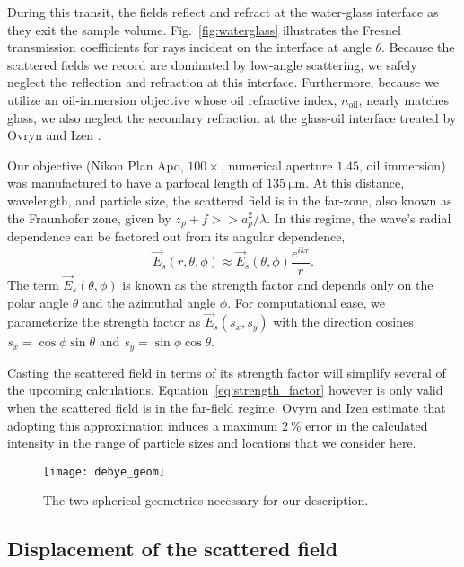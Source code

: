 During this transit, the fields reflect and refract at the water-glass interface as they
exit the sample volume. Fig.~\ref{fig:waterglass} illustrates the Fresnel transmission
coefficients for rays incident on the interface at angle $\theta$.
Because the scattered fields we record are dominated by low-angle scattering,
we safely neglect the reflection and refraction at this interface. Furthermore,
because we utilize an
oil-immersion objective whose oil refractive index, $n_{\text{oil}}$,
nearly matches glass, we also neglect the secondary refraction at the
glass-oil interface treated by Ovryn and Izen \cite{izen00}.

Our objective  (Nikon Plan Apo, $\num{100}\times$, numerical aperture $\num{1.45}$,
oil immersion) was manufactured to have a parfocal length of $\SI{135}{\um}$.
At this distance, wavelength, and particle size, the scattered field is in the far-zone,
also known as the Fraunhofer zone, given by $z_p + f >> a_p^2/\lambda$. In this
regime, the wave's radial dependence can be factored out from its angular dependence,
\begin{equation}
  \label{eq:strength_factor}
  \vec{E}_s(r, \theta, \phi) \approx  \vec{E}_s(\theta, \phi) \frac{e^{ikr}}{r}.
\end{equation}
The term $\vec{E}_s(\theta, \phi)$ is known as the strength factor and
depends only on the polar angle $\theta$ and the azimuthal angle $\phi$. 
For computational ease, we parameterize the strength factor as $\vec{E}_s(s_x, s_y)$
with the direction cosines $s_x=\cos{\phi}\sin{\theta}$ and $s_y = \sin{\phi}\cos{\theta}$.

Casting the scattered field in terms of its strength factor will simplify
several of the upcoming calculations. Equation~\eqref{eq:strength_factor} however
is only valid when the scattered field is in the far-field regime.
Ovyrn and Izen\cite{izen00} estimate that adopting this approximation induces a maximum
$\SI{2}{\percent}$ error in the calculated intensity in the range of particle
sizes and locations that we consider here. %

\begin{figure}
  \centering
  \texttt{[image: debye\_geom]}
  \caption{The two spherical geometries necessary for our description.}
  \label{fig:debye_geom}
\end{figure}

\subsection{ Displacement of the scattered field}

